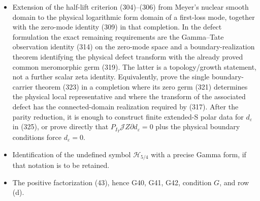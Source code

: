\documentclass[11pt]{article}
\begin{document}
\begin{itemize}
      Equivalently, construct the equality-mode lift (303) from the
      Wiener--Hopf equation (298), or prove the two Hardy estimates (287).
\item Extension of the half-lift criterion (304)--(306) from Meyer's nuclear
      smooth domain to the physical logarithmic form domain of a first-loss
      mode, together with the zero-mode identity (309) in that completion.
      In the defect formulation the exact remaining requirements are the
      Gamma--Tate observation identity (314) on the zero-mode space and a
      boundary-realization theorem identifying the physical defect transform
      with the already proved common meromorphic germ (319).  The latter is
      a topology/growth statement, not a further scalar zeta identity.
      Equivalently, prove the single boundary-carrier theorem (323) in a
      completion where its zero germ (321) determines the physical local
      representative and where the transform of the associated defect has
      the connected-domain realization required by (317).
      After the parity reduction, it is enough to construct finite
      extended-S polar data for $d_\varepsilon$ in (325), or prove directly
      that $P_{I_T}\mathscr JZ\partial d_\varepsilon=0$ plus the physical
      boundary conditions force $d_\varepsilon=0$.
\item Identification of the undefined symbol $\mathcal H_{5/4}$ with a
      precise Gamma form, if that notation is to be retained.
\item The positive factorization (43), hence G40, G41, G42, condition $G$, and
      row (d).
\end{itemize}
\end{document}
